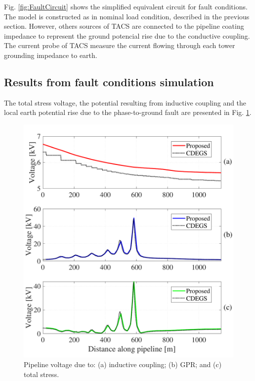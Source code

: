 \documentclass{IEEEtran4PSCC}
\begin{document}
Fig. \ref{fig:FaultCircuit} shows the simplified equivalent circuit for fault conditions. The model is constructed as in nominal load condition, described in the previous section. However, others sources of TACS are connected to the pipeline coating impedance to represent the ground potencial rise due to the conductive coupling. The current probe of TACS measure the current flowing through each tower grounding impedance to earth.

\subsection{Results from fault conditions simulation}

The total stress voltage, the potential resulting from inductive coupling and the local earth potential rise due to the phase-to-ground fault are presented in Fig. \ref{fig:Faultvoltage}.

\begin{figure}[hbt]
	\begin{center}
		\includegraphics[width=1\columnwidth]{./fig/Fault_voltage.pdf}
		\caption{Pipeline voltage due to: (a) inductive coupling; (b) GPR; and (c) total stress.}
		\label{fig:Faultvoltage}
	\end{center}
\end{figure}
\end{document}
